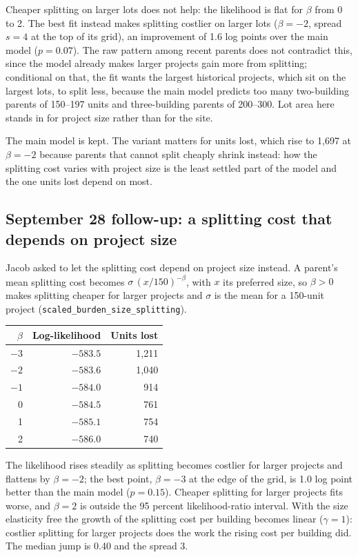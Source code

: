 Cheaper splitting on larger lots does not help: the likelihood is flat for
$\beta$ from 0 to 2. The best fit instead makes splitting costlier on larger
lots ($\beta=-2$, spread $s=4$ at the top of its grid), an improvement of 1.6
log points over the main model ($p=0.07$). The raw pattern among recent
parents does not contradict this, since the model already makes larger
projects gain more from splitting; conditional on that, the fit wants the
largest historical projects, which sit on the largest lots, to split less,
because the main model predicts too many two-building parents of 150--197
units and three-building parents of 200--300. Lot area here stands in for
project size rather than for the site.

The main model is kept. The variant matters for units lost, which rise to
1,697 at $\beta=-2$ because parents that cannot split cheaply shrink instead:
how the splitting cost varies with project size is the least settled part of
the model and the one units lost depend on most.

\subsection*{September 28 follow-up: a splitting cost that depends on project size}

Jacob asked to let the splitting cost depend on project size instead. A
parent's mean splitting cost becomes $\sigma\,(x/150)^{-\beta}$, with $x$ its
preferred size, so $\beta>0$ makes splitting cheaper for larger projects and
$\sigma$ is the mean for a 150-unit project (\texttt{scaled\_burden\_size\_splitting}).

\begin{center}
\small
\begin{tabular}{rrr}
\hline
$\beta$ & Log-likelihood & Units lost \\
\hline
$-3$ & $-583.5$ & 1,211 \\
$-2$ & $-583.6$ & 1,040 \\
$-1$ & $-584.0$ & 914 \\
0 & $-584.5$ & 761 \\
1 & $-585.1$ & 754 \\
2 & $-586.0$ & 740 \\
\hline
\end{tabular}
\end{center}

The likelihood rises steadily as splitting becomes costlier for larger
projects and flattens by $\beta=-2$; the best point, $\beta=-3$ at the edge of
the grid, is 1.0 log point better than the main model ($p=0.15$). Cheaper
splitting for larger projects fits worse, and $\beta=2$ is outside the 95
percent likelihood-ratio interval. With the size elasticity free the growth
of the splitting cost per building becomes linear ($\gamma=1$): costlier
splitting for larger projects does the work the rising cost per building did.
The median jump is 0.40 and the spread 3.

